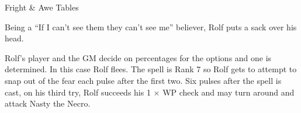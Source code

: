 \begin{Tables}{Fright \& Awe Tables}
\begin{multicols}{3}
\begin{Itemize}
\item Being a “If I can’t see them they can’t see me” believer, 
Rolf puts a sack over his head. 

Rolf’s player and the GM decide on percentages for the options and one
is determined. In this case Rolf flees. The spell is Rank 7 so Rolf
gets to attempt to snap out of the fear each pulse after the first
two. Six pulses after the spell is cast, on his third try, Rolf
succeeds his 1 × WP check and may turn around and attack Nasty the
Necro.
\end{Itemize}

\end{multicols}

\end{Tables}
